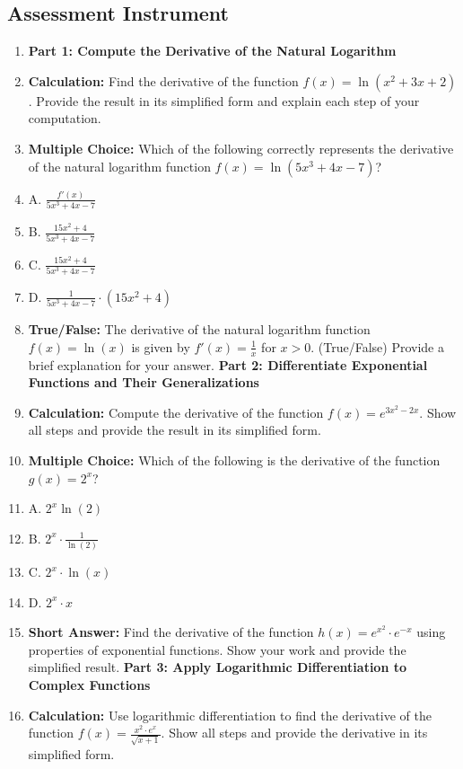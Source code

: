 \subsection{Assessment Instrument}

\begin{enumerate}
    \item \textbf{Part 1: Compute the Derivative of the Natural Logarithm}
    \item \textbf{Calculation:} Find the derivative of the function $f(x) = \ln(x^2 + 3x + 2)$. Provide the result in its simplified form and explain each step of your computation.
    \item \textbf{Multiple Choice:} Which of the following correctly represents the derivative of the natural logarithm function $f(x) = \ln(5x^3 + 4x - 7)$?
    \item A. $\frac{f'(x)}{5x^3 + 4x - 7}$
    \item B. $\frac{15x^2 + 4}{5x^3 + 4x - 7}$
    \item C. $\frac{15x^2 + 4}{5x^3 + 4x - 7}$
    \item D. $\frac{1}{5x^3 + 4x - 7} \cdot (15x^2 + 4)$
    \item \textbf{True/False:} The derivative of the natural logarithm function $f(x) = \ln(x)$ is given by $f'(x) = \frac{1}{x}$ for $x > 0$. (True/False) Provide a brief explanation for your answer. \textbf{Part 2: Differentiate Exponential Functions and Their Generalizations}
    \item \textbf{Calculation:} Compute the derivative of the function $f(x) = e^{3x^2 - 2x}$. Show all steps and provide the result in its simplified form.
    \item \textbf{Multiple Choice:} Which of the following is the derivative of the function $g(x) = 2^x$?
    \item A. $2^x \ln(2)$
    \item B. $2^x \cdot \frac{1}{\ln(2)}$
    \item C. $2^x \cdot \ln(x)$
    \item D. $2^x \cdot x$
    \item \textbf{Short Answer:} Find the derivative of the function $h(x) = e^{x^2} \cdot e^{-x}$ using properties of exponential functions. Show your work and provide the simplified result. \textbf{Part 3: Apply Logarithmic Differentiation to Complex Functions}
    \item \textbf{Calculation:} Use logarithmic differentiation to find the derivative of the function $f(x) = \frac{x^2 \cdot e^{x}}{\sqrt{x + 1}}$. Show all steps and provide the derivative in its simplified form.

\end{enumerate}
